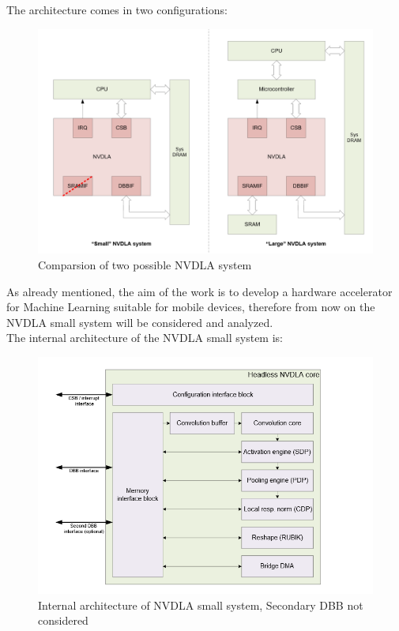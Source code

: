 The architecture comes in two configurations:

\begin{figure}[!htbp]
\centering
\captionsetup{justification=centering}
\includegraphics[scale=0.4]{./figure/nvdla_system.PNG}
\caption{Comparsion of two possible NVDLA system}
\label{fig:nvdlasystem}
\end{figure}
As already mentioned, the aim of the work is to develop a hardware accelerator for Machine Learning suitable for mobile devices, therefore from now on the NVDLA small system will be considered and analyzed.\\
The internal architecture of the NVDLA small system is:
\begin{figure}[!htbp]
\centering
\captionsetup{justification=centering}
\includegraphics[scale=0.5]{./figure/nvdla_internal.PNG}
\centering\caption{Internal architecture of NVDLA small system, Secondary DBB not considered}
\label{fig:nvdlaarch}
\end{figure}

